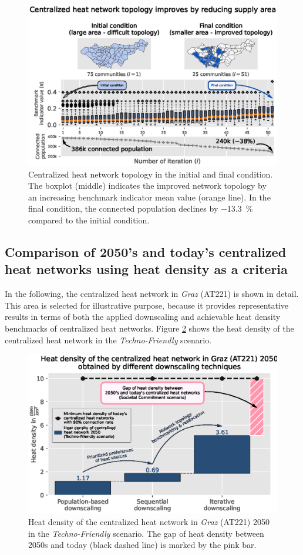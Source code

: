 \begin{figure}
	\centering
	\includegraphics[width=1\linewidth]{figures/4_Results/Fig_Boxplot/ext_boxplot.eps}
	\caption{Centralized heat network topology in the initial and final condition. The boxplot (middle) indicates the improved network topology by an increasing benchmark indicator mean value (orange line). In the final condition, the connected population declines by \SI{-13.3}{\%} compared to the initial condition.}
	\label{fig:res3}
\end{figure}

\subsection{Comparison of 2050's and today's centralized heat networks using heat density as a criteria}\label{res:5}
In the following, the centralized heat network in \textit{Graz} (AT221) is shown in detail. This area is selected for illustrative purpose, because it provides representative results in terms of both the applied downscaling and achievable heat density benchmarks of centralized heat networks. Figure \ref{fig:res5} shows the heat density of the centralized heat network in the \textit{Techno-Friendly} scenario.

\begin{figure}[h]
	\centering
	\includegraphics[width=0.9\linewidth]{figures/4_Results/Fig_Heat-density/HD_cleaned1.eps}
	\caption{Heat density of the centralized heat network in \textit{Graz} (AT221) 2050 in the \textit{Techno-Friendly} scenario. The gap of heat density between 2050s and today (black dashed line) is marked by the pink bar.}
	\label{fig:res5}
\end{figure}

